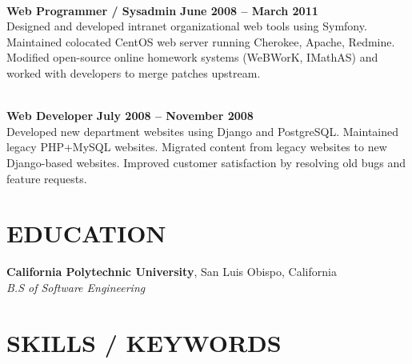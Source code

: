 \documentclass[margin,line]{resume}
\begin{document}
\begin{resume}
     \vspace{1mm}\\%
    \textbf{Web Programmer / Sysadmin} \hfill \textbf{June 2008 -- March 2011}\\
    Designed and developed intranet organizational web tools using Symfony.
    Maintained colocated CentOS web server running Cherokee, Apache, Redmine.
    Modified open-source online homework systems (WeBWorK, IMathAS) and worked with developers to merge patches upstream.

     \vspace{1mm}\\%
    \textbf{Web Developer} \hfill \textbf{July 2008 -- November 2008}\\
    Developed new department websites using Django and PostgreSQL.
    Maintained legacy PHP+MySQL websites.
    Migrated content from legacy websites to new Django-based websites.
    Improved customer satisfaction by resolving old bugs and feature requests.

\sectionline
    \section{\mysidestyle \textbf{\large{E}\small{DUCATION}}}

    \textbf{\listing California Polytechnic University}, San Luis Obispo, California \vspace{1mm}\\
    \textsl{B.S of Software Engineering} \vspace{-3mm}\\\vspace{-1mm}%

\sectionline
    \section{\mysidestyle \textbf{\large{S}\small{KILLS} / \large{K}\small{EYWORDS}}}


\end{resume}
\end{document}
